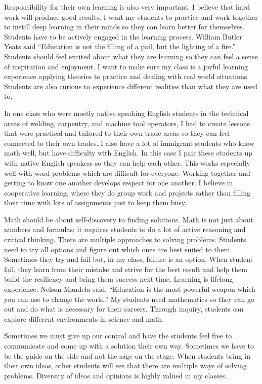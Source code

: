 \documentclass[
]{book}
\begin{document}
Responsibility for their own learning is also very important. I believe that hard work will produce good results. I want my students to practice and work together to instill deep learning in their minds so they can learn better for themselves. Students have to be actively engaged in the learning process. William Butler Yeats said ``Education is not the filling of a pail, but the lighting of a fire.'' Students should feel excited about what they are learning so they can feel a sense of inspiration and enjoyment. I want to make sure my class is a joyful learning experience applying theories to practice and dealing with real world situations. Students are also curious to experience different realities than what they are used to.

In one class who were mostly native speaking English students in the technical areas of welding, carpentry, and machine tool operators, I had to create lessons that were practical and tailored to their own trade areas so they can feel connected to their own trades. I also have a lot of immigrant students who know math well, but have difficulty with English. In this case I pair these students up with native English speakers so they can help each other. This works especially well with word problems which are difficult for everyone. Working together and getting to know one another develops respect for one another. I believe in cooperative learning, where they do group work and projects rather than filling their time with lots of assignments just to keep them busy.

Math should be about self-discovery to finding solutions. Math is not just about numbers and formulas; it requires students to do a lot of active reasoning and critical thinking. There are multiple approaches to solving problems. Students need to try all options and figure out which ones are best suited to them. Sometimes they try and fail but, in my class, failure is an option. When student fail, they learn from their mistake and strive for the best result and help them build the resiliency and bring them success next time. Learning is lifelong experience. Nelson Mandela said, ``Education is the most powerful weapon which you can use to change the world.'' My students need mathematics so they can go out and do what is necessary for their careers. Through inquiry, students can explore different environments in science and math.

Sometimes we must give up our control and have the students feel free to communicate and come up with a solution their own way. Sometimes we have to be the guide on the side and not the sage on the stage. When students bring in their own ideas, other students will see that there are multiple ways of solving problems. Diversity of ideas and opinions is highly valued in my classes.
\end{document}
